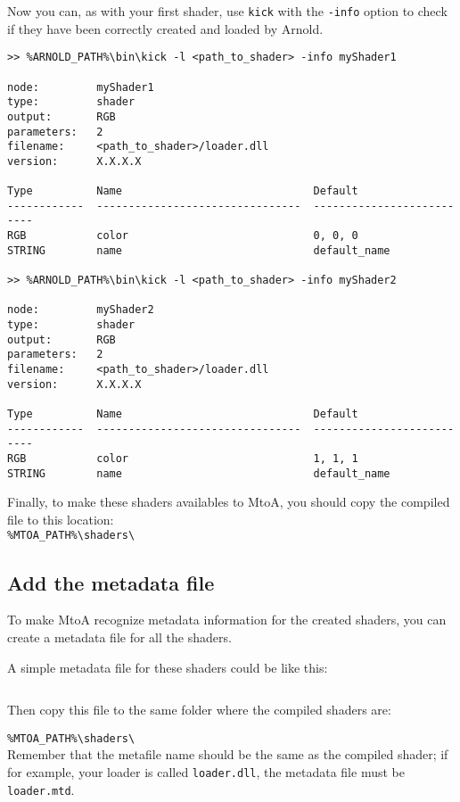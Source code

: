 Now you can, as with your first shader, use \texttt{kick} with the \texttt{-info} option to check if they have been correctly created and loaded by Arnold.

{\footnotesize \begin{verbatim}
>> %ARNOLD_PATH%\bin\kick -l <path_to_shader> -info myShader1

node:         myShader1
type:         shader
output:       RGB
parameters:   2
filename:     <path_to_shader>/loader.dll
version:      X.X.X.X

Type          Name                              Default
------------  --------------------------------  --------------------------
RGB           color                             0, 0, 0
STRING        name                              default_name

>> %ARNOLD_PATH%\bin\kick -l <path_to_shader> -info myShader2

node:         myShader2
type:         shader
output:       RGB
parameters:   2
filename:     <path_to_shader>/loader.dll
version:      X.X.X.X

Type          Name                              Default
------------  --------------------------------  --------------------------
RGB           color                             1, 1, 1
STRING        name                              default_name
\end{verbatim}}


Finally, to make these shaders availables to MtoA, you should copy the compiled file to this location:\\
\verb|%MTOA_PATH%\shaders\|\\

\subsection{Add the metadata file}

To make MtoA recognize metadata information for the created shaders, you can create a metadata file for all the shaders.

A simple metadata file for these shaders could be like this:

\inputminted[mathescape,
linenos,
numbersep=5pt,
frame=lines,
framesep=2mm,
baselinestretch=1,
fontsize=\footnotesize,
tabsize=3,
label=loader.mtd]
{mtd}{loader.mtd}

Then copy this file to the same folder where the compiled shaders are:

\texttt{\%MTOA\_PATH\%\textbackslash shaders\textbackslash}\\

Remember that the metafile name should be the same as the compiled shader; if for example, your loader is called \texttt{loader.dll}, the metadata file must be \texttt{loader.mtd}.
